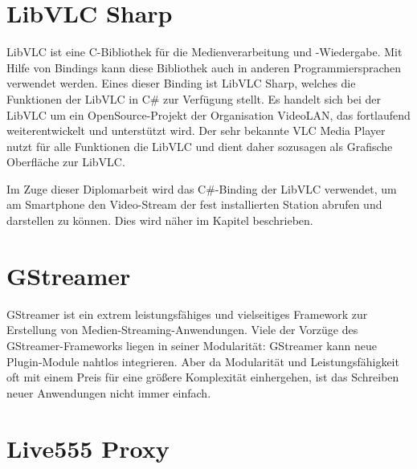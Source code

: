 


\section{LibVLC Sharp}
LibVLC ist eine C-Bibliothek für die Medienverarbeitung und -Wiedergabe.
Mit Hilfe von Bindings kann diese Bibliothek auch in anderen Programmiersprachen verwendet werden.
Eines dieser Binding ist LibVLC Sharp, welches die Funktionen der LibVLC in C\# zur Verfügung stellt.
Es handelt sich bei der LibVLC um ein OpenSource-Projekt der Organisation VideoLAN, das fortlaufend weiterentwickelt und unterstützt wird. Der sehr bekannte VLC Media Player nutzt für alle Funktionen die LibVLC und dient daher sozusagen als Grafische Oberfläche zur LibVLC. \cite[vgl.][]{libvlc}\par

Im Zuge dieser Diplomarbeit wird das C\#-Binding der LibVLC verwendet, um am Smartphone den Video-Stream der fest installierten Station abrufen und darstellen zu können.
Dies wird näher im Kapitel  beschrieben.

\section{GStreamer}
GStreamer ist ein extrem leistungsfähiges und vielseitiges Framework zur Erstellung von Medien-Streaming-Anwendungen.
Viele der Vorzüge des GStreamer-Frameworks liegen in seiner Modularität:
GStreamer kann neue Plugin-Module nahtlos integrieren.
Aber da Modularität und Leistungsfähigkeit oft mit einem Preis für eine größere Komplexität einhergehen, ist das Schreiben neuer Anwendungen nicht immer einfach.
\cite[aus dem Englischen übersetzt]{gstreamer}

\section{Live555 Proxy}